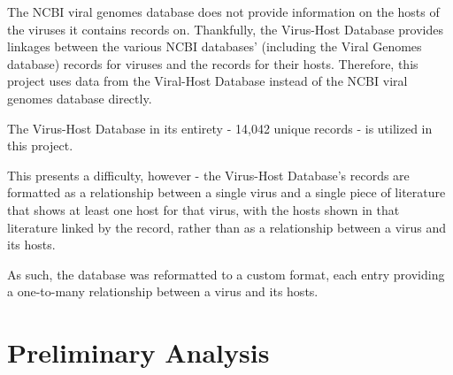 \documentclass[12pt]{article}
\begin{document}
    The NCBI viral genomes database does not provide information on the hosts
    of the viruses it contains records on. Thankfully, the Virus-Host Database provides
    linkages between the various NCBI databases' (including the Viral Genomes
    database) records for viruses and the records for their hosts. Therefore,
    this project uses data from the Viral-Host Database instead of the NCBI viral
    genomes database directly.

    The Virus-Host Database in its entirety - 14,042 unique records - is utilized in
    this project.

    This presents a difficulty, however - the Virus-Host Database's records are
    formatted as a relationship between a single virus and a single piece of
    literature that shows at least one host for that virus, with the hosts shown
    in that literature linked by the record, rather than as a relationship between a
    virus and its hosts.

    As such, the database was reformatted to a custom format, each entry providing
    a one-to-many relationship between a virus and its hosts.


    

    \section{Preliminary Analysis}
\end{document}

